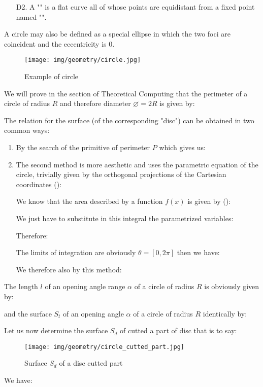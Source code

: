 {\begin{enumerate}
		\item[D2.] A "" is a flat curve all of whose points are equidistant from a fixed point named "".
	\end{enumerate}
	
	\begin{tcolorbox}[title=Remark,colframe=black,arc=10pt]
	A circle may also be defined as a special ellipse in which the two foci are coincident and the eccentricity is $0$.
	\end{tcolorbox}
	
	\begin{figure}[H]
		\centering
		\texttt{[image: img/geometry/circle.jpg]}
		\caption{Example of circle}
	\end{figure}
	We will prove in the section of Theoretical Computing that the perimeter of a circle of radius $R$ and therefore diameter $\varnothing =2R$ is given by:
	
	The relation for the surface (of the corresponding "disc"\label{surface of a disc}) can be obtained in two common ways:
	\begin{enumerate}
		\item By the search of the primitive of perimeter $P$ which gives us:
		
		
		\item The second method is more aesthetic and uses the parametric equation of the circle, trivially given by the orthogonal projections of the Cartesian coordinates ():
		
		We know that the area described by a function $f (x)$ is given by ():
		
		We just have to substitute in this integral the parametrized variables:
		
		Therefore:
		
		The limits of integration are obviously $\theta=[0,2\pi]$ then we have:
		
		We therefore also by this method:
		
	\end{enumerate}
	The length $l$ of an opening angle range $\alpha$ of a circle of radius $R$ is obviously given by:
		
		and the surface $S_t$ of an opening angle $\alpha$ of a circle of radius $R$ identically by:
		
		Let us now determine the surface $S_d$ of cutted a part of disc that is to say:
		\begin{figure}[H]
			\centering
			\texttt{[image: img/geometry/circle\_cutted\_part.jpg]}
			\caption{Surface $S_d$ of a disc cutted part}
		\end{figure}
		We have:
		
}
